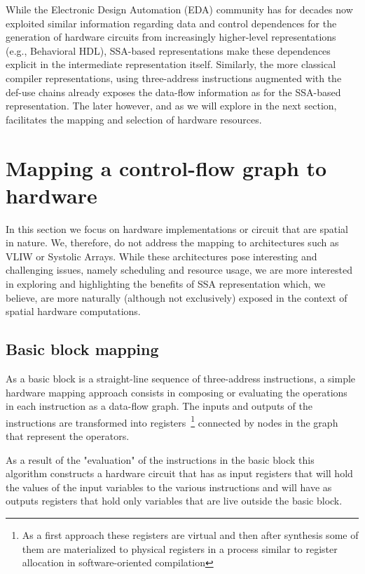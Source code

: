 While the Electronic Design Automation (EDA) community has for decades now exploited similar information regarding data and control dependences for the generation of hardware circuits from increasingly higher-level representations (e.g., Behavioral HDL), SSA-based representations make these dependences explicit in the intermediate representation itself.  Similarly, the more classical compiler representations, using three-address instructions augmented with the def-use chains already exposes the data-flow information as for the SSA-based representation. The later however, and as we will explore in the next section, facilitates the mapping and selection of hardware resources.


\section{Mapping a control-flow graph to hardware}
In this section we focus on hardware implementations or circuit that are spatial in nature.
We, therefore, do not address the mapping to architectures such as VLIW or Systolic Arrays. 
While these architectures pose interesting and challenging issues, namely scheduling and resource usage, we are more interested in exploring and highlighting the benefits of SSA representation which, we believe, are more naturally (although not exclusively) exposed in the context of spatial hardware computations.

\subsection{Basic block mapping}
As a basic block is a straight-line sequence of three-address instructions, a simple hardware mapping approach consists in composing or evaluating the operations in each instruction as a data-flow graph. 
The inputs and outputs of the instructions are transformed into registers~\footnote{As a first approach these registers are virtual and then after synthesis some of them are materialized to physical registers in a process similar to register allocation in software-oriented compilation}  connected by nodes in the graph that represent the operators. 

As a result of the "evaluation" of the instructions in the basic block this algorithm constructs a hardware circuit that has as input registers that will hold the values of the input variables to the various instructions and will have as outputs registers that hold only variables that are live outside the basic block. 


